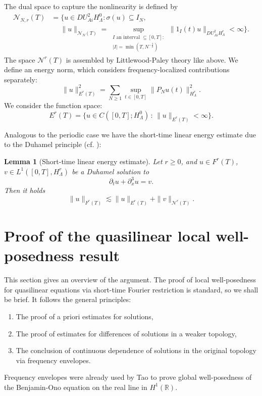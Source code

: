 \documentclass{amsart}
\newtheorem{lemma}[theorem]{Lemma}
\theoremstyle{definition}
\newcommand{\R}{\mathbb{R}}
\begin{document}
The dual space to capture the nonlinearity is defined by
\begin{equation*}
\begin{split}
\mathcal{N}_{N,r}(T) &= \{ u \in DU^2_{Ai} H^0_\Lambda : \sigma(u) \subseteq I_N, 
 \\ &\quad \; \| u \|_{\mathcal{N}_N(T)} = \sup_{\substack{I \text{ an interval } \subseteq [0,T] : \\  | I| = \min(T,  N^{-\frac{3}{2}})}} \| 1_I(t) u \|_{DU^2_{Ai} H^r_{\Lambda}} < \infty \}.
\end{split}
\end{equation*}
The space $\mathcal{N}^{r}(T)$ is assembled by Littlewood-Paley theory like above. We define an energy norm, which considers frequency-localized contributions separately:
\begin{equation*}
\| u \|_{E^{r}(T)}^2 = \sum_{N \geq 1} \sup_{t \in [0,T]} \| P_N u(t) \|_{H^r_{\Lambda}}^2.
\end{equation*}
We consider the function space:
\begin{equation*}
E^{r}(T) = \{ u \in C([0,T];H^0_{\Lambda}) \, : \, \| u \|_{E^{r}(T)} < \infty \}.
\end{equation*}

Analogous to the periodic case we have the short-time linear energy estimate due to the Duhamel principle (cf. \cite[Lemma~2.4.1]{ShorttimeFourierTransformRestriction}):
\begin{lemma}[Short-time linear energy estimate]
\label{lem:LinearEnergyEstimate}
Let $r \geq 0$, and $u \in F^{r}(T)$, $v \in L^1([0,T],H^r_\Lambda)$ be a Duhamel solution to 
\begin{equation*}
\partial_t u + \partial_x^3 u = v.
\end{equation*} 
Then it holds
\begin{equation*}
\| u \|_{F^{r}(T)} \lesssim \| u \|_{E^{r}(T)} + \| v \|_{\mathcal{N}^{r}(T)}.
\end{equation*}
\end{lemma}

\section{Proof of the quasilinear local well-posedness result}
\label{section:QuasilinearLWP}

This section gives an overview of the argument. The proof of local well-posedness for quasilinear equations via short-time Fourier restriction is standard, so we shall be brief. It follows the general principles:
\begin{enumerate}
\item The proof of a priori estimates for solutions,
\item The proof of estimates for differences of solutions in a weaker topology,
\item The conclusion of continuous dependence of solutions in the original topology via frequency envelopes.
\end{enumerate}
Frequency envelopes were already used by Tao \cite{Tao2004} to prove global well-posedness of the Benjamin-Ono equation on the real line in $H^1(\R)$.
\end{document}
